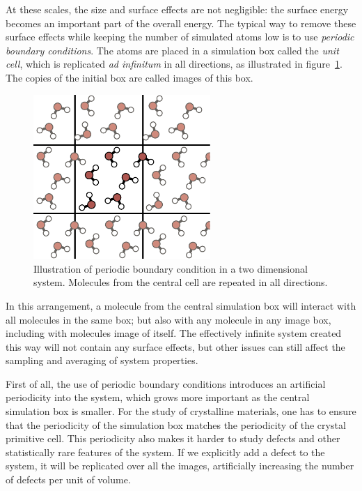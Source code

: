 \documentclass[thesis]{subfiles}
\begin{document}
At these scales, the size and surface effects are not negligible: the surface
energy becomes an important part of the overall energy. The typical way to
remove these surface effects while keeping the number of simulated atoms low is
to use \emph{periodic boundary conditions}. The atoms are placed in a simulation
box called the \emph{unit cell}, which is replicated \emph{ad infinitum} in all
directions, as illustrated in figure~\ref{fig:pbc}.  The copies of the initial
box are called images of this box.

\begin{figure}[b]
    \centering
    \includegraphics[width=0.6\textwidth]{figures/images/pbc}
    \caption{Illustration of periodic boundary condition in a two dimensional
    system. Molecules from the central cell are repeated in all directions.}
    \label{fig:pbc}
\end{figure}

In this arrangement, a molecule from the central simulation box will interact
with all molecules in the same box; but also with any molecule in any image
box, including with molecules image of itself. The effectively infinite
system created this way will not contain any surface effects, but other issues
can still affect the sampling and averaging of system properties.

First of all, the use of periodic boundary conditions introduces an artificial
periodicity into the system, which grows more important as the central
simulation box is smaller. For the study of crystalline materials, one has to
ensure that the periodicity of the simulation box matches the periodicity of the
crystal primitive cell. This periodicity also makes it harder to study defects
and other statistically rare features of the system. If we explicitly add a
defect to the system, it will be replicated over all the images, artificially
increasing the number of defects per unit of volume.
\end{document}
